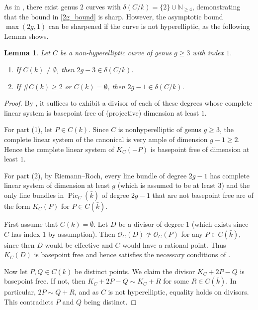 \documentclass[a4paper,11pt]{amsart}
\theoremstyle{plain}
\newtheorem{lemma}[thm]{Lemma}
\theoremstyle{remark}
\newcommand{\nn}{\mathbb{N}}
\newcommand{\Pic}{\operatorname{Pic}}
\newcommand{\dendegs}{\delta}
\begin{document}
As in \cite[Example 5.1.3]{VV}, there exist genus \(2\) curves with $\dendegs(C/k)=\{2\}\cup\nn_{\geq 4}$, demonstrating that the bound in \eqref{2g_bound} is sharp. However, the asymptotic bound $\max(2g,1)$ can be sharpened if the curve is not hyperelliptic, as the following Lemma shows.

\begin{lemma}\label{curve_asymptotic}
    Let \(C\) be a non-hyperelliptic curve of genus \(g \geq 3\) with index \(1\).
    \begin{enumerate}
        \item If \(C(k) \neq \emptyset\), then \(2g - 3 \in \dendegs(C/k)\).
        \item If \(\#C(k) \geq 2\) or \(C(k) = \emptyset\), then \(2g - 1\in \dendegs(C/k)\).
    \end{enumerate}
\end{lemma}
\begin{proof}
    By \cite[Lemma 4.1.4]{VV}, it suffices to exhibit a divisor of each of these degrees whose complete linear system is basepoint free of (projective) dimension at least \(1\).  

    For part (1), let \(P \in C(k)\).   Since \(C\) is nonhyperelliptic of genus \(g \geq 3\), the complete linear system of the canonical is very ample of dimension \(g-1 \geq 2\).  Hence the complete linear system of \(K_C(-P)\) is basepoint free of dimension at least \(1\). 

    For part (2), by Riemann--Roch, every line bundle of degree \(2g-1\) has complete linear system of dimension at least \(g\) (which is assumed to be at least \(3\)) and the only line bundles in \(\Pic_C(\bar{k})\) of degree \(2g-1\) that are not basepoint free are of the form \(K_C(P)\) for \(P \in C(\bar{k})\).

    
    First assume that \(C(k) = \emptyset\).  Let \(D\) be a divisor of degree \(1\) (which exists since \(C\) has index \(1\) by assumption).  Then \(\mathcal{O}_C(D) \not\simeq \mathcal{O}_C(P)\) for any \(P \in C(\bar{k})\), since then \(D\) would be effective and \(C\) would have a rational point. Thus \(K_C(D)\) is basepoint free and hence satisfies the necessary conditions of \cite[Lemma  4.1.4]{VV}.
    
    Now let \(P, Q \in C(k)\) be distinct points. 
    We claim the divisor $K_C + 2P - Q$ is basepoint free. If not, then $K_C + 2P - Q \sim K_C + R$ for some $R \in C(\bar{k})$. In particular, $2P \sim Q + R$, and as $C$ is not hyperelliptic, equality holds on divisors. This contradicts $P$ and $Q$ being distinct.
\end{proof}
\end{document}
